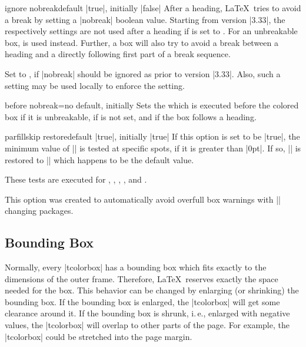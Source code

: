 \begin{docTcbKey}[][doc new=2014-12-11]{ignore nobreak}{}{default |true|, initially |false|}
After a heading, \LaTeX\ tries to avoid a break by setting a |nobreak| boolean value.
Starting from version |3.33|, the  respectively 
settings are not used after a heading if  is
set to . For an unbreakable box,  is used instead.
Further, a  box will also try to
avoid a break between a heading and a directly following first part of a
break sequence.

Set  to , if |nobreak| should be
ignored as prior to version |3.33|. Also, such a setting may be used locally to
enforce the  setting.
\end{docTcbKey}

\begin{docTcbKey}[][doc new=2014-12-16]{before nobreak}{=}{no default, initially }
  Sets the  which is executed before the colored box if it
  is unbreakable, if  is not set, and if
  the box follows a heading.
\end{docTcbKey}


\begin{docTcbKey}[][doc new=2017-02-23]{parfillskip restore}{}{default |true|, initially |true|}
  If this option is set to be |true|, the minimum value of |\parfillskip| is
  tested at specific spots, if it is greater than |0pt|.
  If so, |\parfillskip| is restored to |\@flushglue| which happens to be
  the default value.

  These tests are executed for
  ,
  ,
  ,
  , and
  .

  This option was created to automatically
  avoid overfull box warnings with |\parfillskip| changing packages.
\end{docTcbKey}



\clearpage
\subsection{Bounding Box}
Normally, every |tcolorbox| has a bounding box which fits exactly to the
dimensions of the outer frame. Therefore, \LaTeX\ reserves exactly the space
needed for the box.
This behavior can be changed by enlarging (or shrinking) the bounding box.
If the bounding box is enlarged, the |tcolorbox| will get some clearance
around it. If the bounding box is shrunk, i.\,e., enlarged with negative
values, the |tcolorbox| will overlap to other parts of the page.
For example, the |tcolorbox| could be stretched into the page margin.

